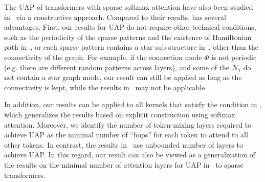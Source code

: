 \documentclass{article}
\newcommand{\ql}[1]{{\footnotesize\textcolor{red}{QL: #1}}}
\begin{document}

The UAP of transformers with sparse softmax attention have also been studied in~\cite{yun2020n,zaheer2020big} via a constructive approach.
Compared to their results,  has several advantages. First, our results for UAP do not require other technical conditions, such as the periodicity of the sparse patterns and the existence of Hamiltonian path in~\cite{yun2020n}, or each sparse pattern contains a star sub-structure in~\cite{zaheer2020big}, other than the connectivity of the graph. For example, if the connection mode $\Phi$ is not periodic (e.g. there are different random patterns across layers), and some of the $\mathcal N_i$ do not contain a star graph mode, our result can still be applied as long as the connectivity is kept, while the results in~\cite{yun2020n,zaheer2020big} may not be applicable.

In addition, our results can be applied to all kernels that satisfy the condition in , which generalizes the results based on explicit construction using softmax attention. Moreover, we identify the number of token-mixing layers required to achieve UAP as the minimal number of ``hops'' for each token to attend to all other tokens.
In contrast, the results in~\cite{yun2020n,zaheer2020big} use unbounded number of layers to achieve UAP.
In this regard, our result can also be viewed as a generalization of the results on the minimal number of attention layers for UAP in~\cite{kajitsukatransformers} to sparse transformers.

\end{document}
